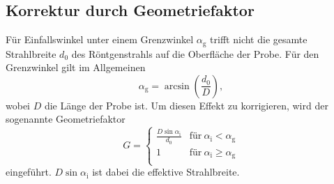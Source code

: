 \subsection{Korrektur durch Geometriefaktor}
Für Einfallswinkel unter einem Grenzwinkel $\alpha_\mathrm{g}$ trifft nicht die gesamte Strahlbreite $d_0$ des Röntgenstrahls auf die Oberfläche der Probe. Für den Grenzwinkel gilt im Allgemeinen
\begin{equation*}
  \alpha_\mathrm{g} = \arcsin \left( \frac{d_0}{D} \right),
\end{equation*}
wobei $D$ die Länge der Probe ist. Um diesen Effekt zu korrigieren, wird der sogenannte Geometriefaktor
\begin{equation}
  G = \left\{
  \begin{array}{ll}
    \frac{D \sin \alpha_\mathrm{i}}{d_0} & \mathrm{für }\  \alpha_\mathrm{i} < \alpha_\mathrm{g}\\
    1 & \mathrm{für }\  \alpha_\mathrm{i} \geq \alpha_\mathrm{g} \\
\end{array}
\right.
  \label{eqn:geofaktor}
\end{equation}
eingeführt. $D \sin \alpha_\mathrm{i}$ ist dabei die effektive Strahlbreite.
